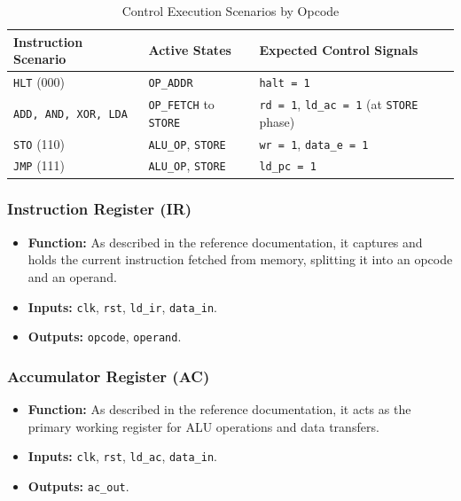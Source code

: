 \begin{table}[H]
	\centering
	\caption{Control Execution Scenarios by Opcode}
	\renewcommand{\arraystretch}{1.3}
	\begin{tabular}{|l|l|l|}
		\hline
		\textbf{Instruction Scenario} & \textbf{Active States}               & \textbf{Expected Control Signals}                              \\ \hline
		\texttt{HLT} (000)            & \texttt{OP\_ADDR}                    & \texttt{halt = 1}                                              \\ \hline
		\texttt{ADD, AND, XOR, LDA}   & \texttt{OP\_FETCH} to \texttt{STORE} & \texttt{rd = 1}, \texttt{ld\_ac = 1} (at \texttt{STORE} phase) \\ \hline
		\texttt{STO} (110)            & \texttt{ALU\_OP}, \texttt{STORE}     & \texttt{wr = 1}, \texttt{data\_e = 1}                          \\ \hline
		\texttt{JMP} (111)            & \texttt{ALU\_OP}, \texttt{STORE}     & \texttt{ld\_pc = 1}                                            \\ \hline
	\end{tabular}
\end{table}

\subsubsection*{Instruction Register (IR)}
\begin{itemize}
	\item \textbf{Function:} As described in the reference documentation, it captures and holds the current instruction fetched from memory, splitting it into an opcode and an operand.
	\item \textbf{Inputs:} \texttt{clk}, \texttt{rst}, \texttt{ld\_ir}, \texttt{data\_in}.
	\item \textbf{Outputs:} \texttt{opcode}, \texttt{operand}.
\end{itemize}

\subsubsection*{Accumulator Register (AC)}
\begin{itemize}
	\item \textbf{Function:} As described in the reference documentation, it acts as the primary working register for ALU operations and data transfers.
	\item \textbf{Inputs:} \texttt{clk}, \texttt{rst}, \texttt{ld\_ac}, \texttt{data\_in}.
	\item \textbf{Outputs:} \texttt{ac\_out}.
\end{itemize}

